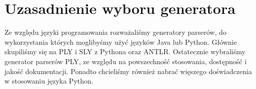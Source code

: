 \chapter{Uzasadnienie wyboru generatora}

Ze względu języki programowania rozważaliśmy generatory parserów, do wykorzystania których moglibyśmy użyć języków Java lub Python. 
Głównie skupiliśmy się na PLY i SLY z Pythona oraz ANTLR. Ostatecznie wybraliśmy generator parserów PLY, ze względu na powszechność 
stosowania, dostępność i jakość dokumentacji. Ponadto chcieliśmy również nabrać więszego doświadczenia w stosowaniu języka Python.
